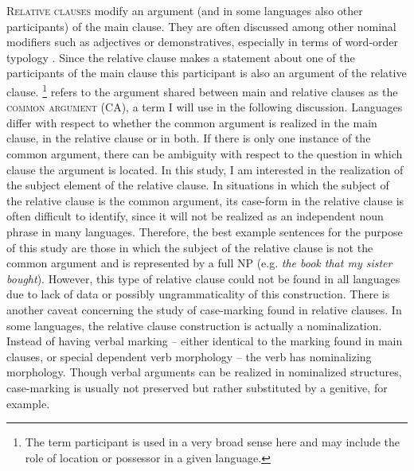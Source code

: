 \textsc{Relative clauses} modify an argument (and in some languages also other participants) of the main clause. 
They are often discussed among other nominal modifiers such as adjectives or demonstratives, especially in terms of word-order typology \citep[cf.][]{WALS90}. 
Since the relative clause makes a statement about one of the participants of the main clause this participant is also an argument of the relative clause.
\footnote{The term participant is used in a very broad sense here and may include the role of location or possessor in a given language.}
\citet[314]{Dixon:2010-2} refers to the argument shared between main and relative clauses as the \textsc{common argument} (CA), a term I will use in the following discussion. 
Languages differ with respect to whether the common argument is realized in the main clause, in the relative clause or in both. 
If there is only one instance of the common argument, there can be ambiguity with respect to the question in which clause the argument is located.
In this study, I am interested in the realization of the subject element of the relative clause. 
In situations in which the subject of the relative clause is the common argument, its case-form in the relative clause is often difficult to identify, since it will not be realized as an independent noun phrase in many languages. 
Therefore, the best example sentences for the purpose of this study are those in which the subject of the relative clause is not the common argument and is represented by a full NP (e.g. \emph{the book that my sister bought}). 
However, this type of relative clause could not be found in all languages due to lack of data or possibly ungrammaticality of this construction.
There is another caveat concerning the study of case-marking found in relative clauses. 
In some languages, the relative clause construction is actually a nominalization. 
Instead of having verbal marking -- either identical to the marking found in main clauses, or special dependent verb morphology -- the verb has nominalizing morphology. 
Though verbal arguments can be realized in nominalized structures, case-marking is usually not preserved but rather substituted by a genitive, for example. 

